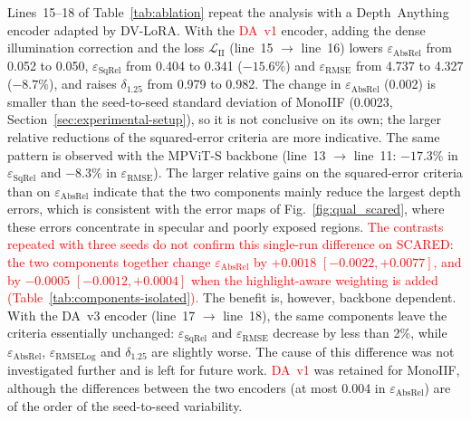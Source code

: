 \documentclass[a4paper,fleqn]{cas-dc}
\begin{document}
{{Lines~15--18 of Table~\ref{tab:ablation} repeat the analysis with a Depth~Anything encoder adapted by DV-LoRA. With the \textcolor{red}{DA~v1} encoder, adding the dense illumination correction and the loss $\mathcal{L}_\textrm{II}$ (line~15 $\rightarrow$ line~16) lowers $\varepsilon_\textrm{AbsRel}$ from 0.052 to 0.050, $\varepsilon_\textrm{SqRel}$ from 0.404 to 0.341 ($-15.6\%$) and $\varepsilon_\textrm{RMSE}$ from 4.737 to 4.327 ($-8.7\%$), and raises $\delta_{1.25}$ from 0.979 to 0.982. The change in $\varepsilon_\textrm{AbsRel}$ (0.002) is smaller than the seed-to-seed standard deviation of MonoIIF (0.0023, Section~\ref{sec:experimental-setup}), so it is not conclusive on its own; the larger relative reductions of the squared-error criteria are more indicative. The same pattern is observed with the MPViT-S backbone (line~13 $\rightarrow$ line~11: $-17.3\%$ in $\varepsilon_\textrm{SqRel}$ and $-8.3\%$ in $\varepsilon_\textrm{RMSE}$). The larger relative gains on the squared-error criteria than on $\varepsilon_\textrm{AbsRel}$ indicate that the two components mainly reduce the largest depth errors, which is consistent with the error maps of Fig.~\ref{fig:qual_scared}, where these errors concentrate in specular and poorly exposed regions. \textcolor{red}{The contrasts repeated with three seeds do not confirm this single-run difference on SCARED: the two components together change $\varepsilon_\textrm{AbsRel}$ by $+0.0018$ $[-0.0022, +0.0077]$, and by $-0.0005$ $[-0.0012, +0.0004]$ when the highlight-aware weighting is added (Table~\ref{tab:components-isolated}).}
The benefit is, however, backbone dependent. With the DA~v3 encoder (line~17 $\rightarrow$ line~18), the same components leave the criteria essentially unchanged: $\varepsilon_\textrm{SqRel}$ and $\varepsilon_\textrm{RMSE}$ decrease by less than 2\%, while $\varepsilon_\textrm{AbsRel}$, $\varepsilon_\textrm{RMSELog}$ and $\delta_{1.25}$ are slightly worse. The cause of this difference was not investigated further and is left for future work. \textcolor{red}{DA~v1} was retained for MonoIIF, although the differences between the two encoders (at most 0.004 in $\varepsilon_\textrm{AbsRel}$) are of the order of the seed-to-seed variability.}

}
\end{document}
